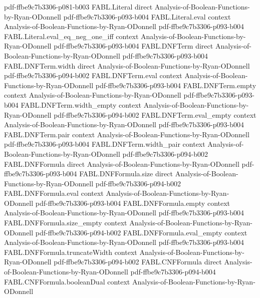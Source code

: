 \begin{theorem}
  {pdf-ffbe9c7b3306-p081-b003}
\proofstep
  {FABL.Literal}
  {direct}
  {Analysis-of-Boolean-Functions-by-Ryan-ODonnell}
  {pdf-ffbe9c7b3306-p093-b004}
\proofstep
  {FABL.Literal.eval}
  {context}
  {Analysis-of-Boolean-Functions-by-Ryan-ODonnell}
  {pdf-ffbe9c7b3306-p093-b004}
\proofstep
  {FABL.Literal.eval_eq_neg_one_iff}
  {context}
  {Analysis-of-Boolean-Functions-by-Ryan-ODonnell}
  {pdf-ffbe9c7b3306-p093-b004}
\proofstep
  {FABL.DNFTerm}
  {direct}
  {Analysis-of-Boolean-Functions-by-Ryan-ODonnell}
  {pdf-ffbe9c7b3306-p093-b004}
\proofstep
  {FABL.DNFTerm.width}
  {direct}
  {Analysis-of-Boolean-Functions-by-Ryan-ODonnell}
  {pdf-ffbe9c7b3306-p094-b002}
\proofstep
  {FABL.DNFTerm.eval}
  {context}
  {Analysis-of-Boolean-Functions-by-Ryan-ODonnell}
  {pdf-ffbe9c7b3306-p093-b004}
\proofstep
  {FABL.DNFTerm.empty}
  {context}
  {Analysis-of-Boolean-Functions-by-Ryan-ODonnell}
  {pdf-ffbe9c7b3306-p093-b004}
\proofstep
  {FABL.DNFTerm.width_empty}
  {context}
  {Analysis-of-Boolean-Functions-by-Ryan-ODonnell}
  {pdf-ffbe9c7b3306-p094-b002}
\proofstep
  {FABL.DNFTerm.eval_empty}
  {context}
  {Analysis-of-Boolean-Functions-by-Ryan-ODonnell}
  {pdf-ffbe9c7b3306-p093-b004}
\proofstep
  {FABL.DNFTerm.pair}
  {context}
  {Analysis-of-Boolean-Functions-by-Ryan-ODonnell}
  {pdf-ffbe9c7b3306-p093-b004}
\proofstep
  {FABL.DNFTerm.width_pair}
  {context}
  {Analysis-of-Boolean-Functions-by-Ryan-ODonnell}
  {pdf-ffbe9c7b3306-p094-b002}
\proofstep
  {FABL.DNFFormula}
  {direct}
  {Analysis-of-Boolean-Functions-by-Ryan-ODonnell}
  {pdf-ffbe9c7b3306-p093-b004}
\proofstep
  {FABL.DNFFormula.size}
  {direct}
  {Analysis-of-Boolean-Functions-by-Ryan-ODonnell}
  {pdf-ffbe9c7b3306-p094-b002}
\proofstep
  {FABL.DNFFormula.eval}
  {context}
  {Analysis-of-Boolean-Functions-by-Ryan-ODonnell}
  {pdf-ffbe9c7b3306-p093-b004}
\proofstep
  {FABL.DNFFormula.empty}
  {context}
  {Analysis-of-Boolean-Functions-by-Ryan-ODonnell}
  {pdf-ffbe9c7b3306-p093-b004}
\proofstep
  {FABL.DNFFormula.size_empty}
  {context}
  {Analysis-of-Boolean-Functions-by-Ryan-ODonnell}
  {pdf-ffbe9c7b3306-p094-b002}
\proofstep
  {FABL.DNFFormula.eval_empty}
  {context}
  {Analysis-of-Boolean-Functions-by-Ryan-ODonnell}
  {pdf-ffbe9c7b3306-p093-b004}
\proofstep
  {FABL.DNFFormula.truncateWidth}
  {context}
  {Analysis-of-Boolean-Functions-by-Ryan-ODonnell}
  {pdf-ffbe9c7b3306-p094-b002}
\proofstep
  {FABL.CNFFormula}
  {direct}
  {Analysis-of-Boolean-Functions-by-Ryan-ODonnell}
  {pdf-ffbe9c7b3306-p094-b004}
\proofstep
  {FABL.CNFFormula.booleanDual}
  {context}
  {Analysis-of-Boolean-Functions-by-Ryan-ODonnell}

\end{theorem}

